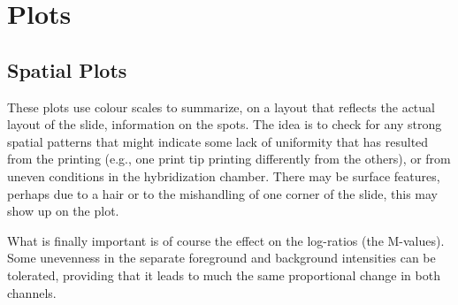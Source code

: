\documentclass[a4paper,9pt]{article}\usepackage[]{graphicx}\usepackage[]{color}
\begin{document}
\section{Plots}

\subsection{Spatial Plots}
These plots use colour scales to summarize, on a layout that reflects
the actual layout of the slide, information on the spots.  The idea is
to check for any strong spatial patterns that might indicate some lack
of uniformity that has resulted from the printing (e.g., one print tip
printing differently from the others), or from uneven conditions in
the hybridization chamber.  There may be surface features, perhaps due
to a hair or to the mishandling of one corner of the slide, this may
show up on the plot.

What is finally important is of course the effect on the log-ratios
(the M-values).  Some unevenness in the separate foreground and
background intensities can be tolerated, providing that it leads to
much the same proportional change in both channels.
\end{document}
